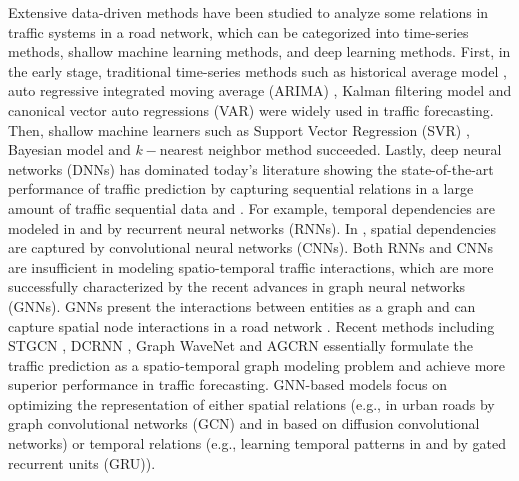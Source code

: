 Extensive data-driven methods have been studied to analyze some relations in traffic systems in a road network, which can be categorized into time-series methods, shallow machine learning methods, and deep learning methods. First, in the early stage, traditional time-series methods such as  historical average model \cite{liu2004summary}, auto regressive integrated moving average (ARIMA) \cite{williams2003modeling}, Kalman filtering model \cite{OKUTANI19841} and canonical  vector auto regressions (VAR) \cite{zivot2006vector} were widely used in traffic forecasting. Then, shallow machine learners such as Support Vector Regression (SVR) \cite{1364002}, Bayesian model \cite{1603558} and $k-$nearest neighbor method \cite{zhang2009short} succeeded. Lastly, deep neural networks (DNNs) has dominated today's literature showing the state-of-the-art performance of traffic prediction by capturing sequential relations in a large amount of traffic sequential data \cite{lv2014traffic} and \cite{yu2017deep}. For example, temporal dependencies are modeled in \cite{zhao2017lstm} and \cite{ma2015long} by recurrent neural networks (RNNs). In \cite{wu2016short,ma2017learning,zhang2017deep}, spatial dependencies are captured by convolutional neural networks (CNNs). Both RNNs and CNNs are insufficient in modeling spatio-temporal traffic interactions, which are more successfully characterized by the recent advances in graph neural networks (GNNs). GNNs present the interactions between entities as a graph and can capture spatial node interactions in a road network \cite{wu2020comprehensive, jiang2021graph}. Recent methods including STGCN \cite{yu2017spatio}, DCRNN \cite{li2017diffusion}, Graph WaveNet \cite{wu2019graph} and AGCRN \cite{bai2020adaptive} essentially formulate the traffic prediction as a spatio-temporal graph modeling problem and achieve more superior performance in traffic forecasting. GNN-based models focus on optimizing the representation of either spatial relations (e.g., \cite{yu2017spatio} in urban roads by graph convolutional networks (GCN) and in \cite{li2017diffusion} based on diffusion convolutional networks) or temporal relations (e.g., learning temporal patterns in \cite{bai2020adaptive} and \cite{wang2020traffic} by gated recurrent units (GRU)).

